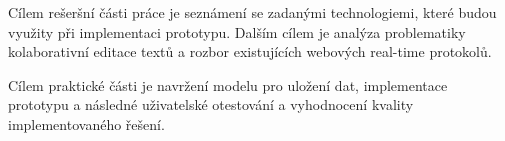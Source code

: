 
Cílem rešeršní části práce je seznámení se zadanými technologiemi, které budou využity při implementaci prototypu.
Dalším cílem je analýza problematiky kolaborativní editace textů a rozbor existujících webových real-time protokolů.



Cílem praktické části je navržení modelu pro uložení dat, implementace prototypu a následné uživatelské otestování a vyhodnocení kvality implementovaného řešení.


